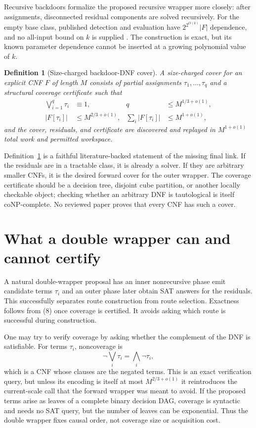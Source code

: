 \documentclass[11pt]{article}
\newtheorem{definition}[theorem]{Definition}
\begin{document}
Recursive backdoors formalize the proposed recursive wrapper more closely:
after assignments, disconnected residual components are solved recursively.
For the empty base class, published detection and evaluation have
$2^{2^{O(k)}}|F|$ dependence, and no all-input bound on $k$ is supplied
\cite{mahlmannsiebertzvigny2021}.  The construction is exact, but its known
parameter dependence cannot be inserted at a growing polynomial value of
$k$.

\begin{definition}[Size-charged backdoor-DNF cover]\label{def:scbdnf}
A size-charged cover for an explicit CNF $F$ of length $M$ consists of
partial assignments $\tau_1,\ldots,\tau_q$ and a structural coverage
certificate such that
\begin{align*}
 \bigvee_{i=1}^q \tau_i&\equiv 1,
 &q&\le M^{1/3+o(1)},\\
 |F[\tau_i]|&\le M^{2/3+o(1)},
 &\sum_i |F[\tau_i]|&\le M^{1+o(1)},
\end{align*}
and the cover, residuals, and certificate are discovered and replayed in
$M^{1+o(1)}$ total work and permitted workspace.
\end{definition}

Definition~\ref{def:scbdnf} is a faithful literature-backed statement of
the missing final link.  If the residuals are in a tractable class, it is
already a solver.  If they are arbitrary smaller CNFs, it is the desired
forward cover for the outer wrapper.  The coverage certificate should be a
decision tree, disjoint cube partition, or another locally checkable object;
checking whether an arbitrary DNF is tautological is itself coNP-complete.
No reviewed paper proves that every CNF has such a cover.

\section{What a double wrapper can and cannot certify}

A natural double-wrapper proposal has an inner nonrecursive phase emit
candidate terms $\tau_i$ and an outer phase later obtain SAT answers for the
residuals.  This successfully separates route construction from route
selection.  Exactness follows from (8) once coverage is certified.  It avoids
asking which route is successful during construction.

One may try to verify coverage by asking whether the complement of the DNF
is satisfiable.  For terms $\tau_i$, noncoverage is
\[
 \neg\bigvee_i\tau_i=\bigwedge_i\neg\tau_i,
\]
which is a CNF whose clauses are the negated terms.  This is an exact
verification query, but unless its encoding is itself at most
$M^{2/3+o(1)}$ it reintroduces the current-scale call that the forward
wrapper was meant to avoid.  If the proposed terms arise as leaves of a
complete binary decision DAG, coverage is syntactic and needs no SAT query,
but the number of leaves can be exponential.  Thus the double wrapper fixes
causal order, not coverage size or acquisition cost.
\end{document}
